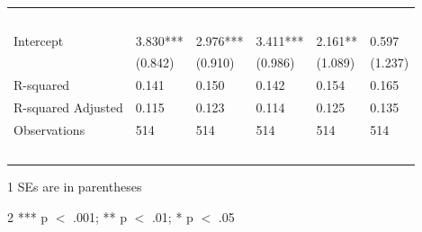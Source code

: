 \documentclass[12pt]{article}
\begin{document}
\begin{table}[!ht]
\begin{tabular}{llllll}
        & ~ & ~ & ~ & ~ & ~ \\
        Intercept & 3.830*** & 2.976*** & 3.411*** & 2.161** & 0.597 \\
        ~ & (0.842) & (0.910) & (0.986) & (1.089) & (1.237) \\
        R-squared & 0.141 & 0.150 & 0.142 & 0.154 & 0.165 \\
        R-squared Adjusted & 0.115 & 0.123 & 0.114 & 0.125 & 0.135 \\
        Observations  & 514 & 514 & 514 & 514 & 514 \\
        ~ & ~ & ~ & ~ & ~ & ~ \\
        \midrule
    \end{tabular}
    \begin{tablenotes}
      \item[1] SEs are in parentheses
      \item[2] *** p $<$ .001; ** p $<$ .01; * p $<$ .05
\end{tablenotes}
  \label{table6}
\end{table}
\end{document}

